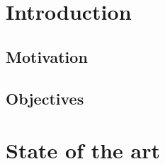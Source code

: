 \documentclass[12pt]{report} %
\begin{document}
\newpage %
\thispagestyle{empty}
\mbox{}


\clearpage
{} %

\chapter{Introduction}
\section{Motivation}
\section{Objectives}

\chapter{State of the art}
\end{document}
